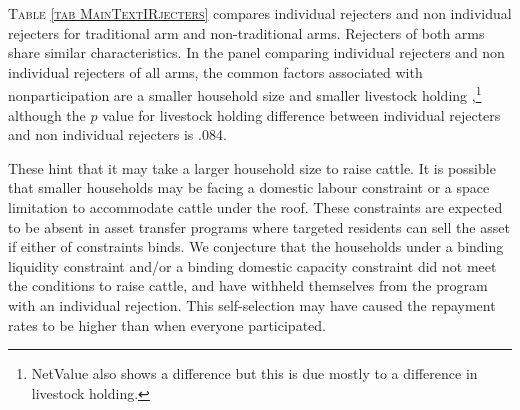 	\textsc{\normalsize Table \ref{tab MainTextIRjecters}} compares individual rejecters and non individual rejecters for \textsf{traditional} arm and non-\textsf{traditional} arms. Rejecters of both arms share similar characteristics. %
	In the panel comparing individual rejecters and non individual rejecters of all arms, the common factors associated with nonparticipation are a smaller household size and smaller livestock holding%
	,\footnote{\textsf{NetValue} also shows a difference but this is due mostly to a difference in livestock holding. } although the $p$ value for livestock holding difference between individual rejecters and non individual rejecters is .084.

	These hint that it may take a larger household size to raise cattle. %
	It is possible that smaller households may be facing a domestic labour constraint or a space limitation to accommodate cattle under the roof. These constraints are expected to be absent in asset transfer programs where targeted residents can sell the asset if either of constraints binds. We conjecture that the households under a binding liquidity constraint and/or a binding domestic capacity constraint did not meet the conditions to raise cattle, and have withheld themselves from the program with an individual rejection. This self-selection may have caused the repayment rates to be higher than when everyone participated. 

